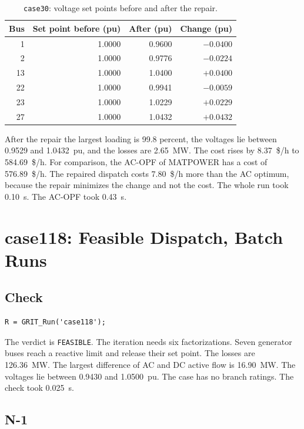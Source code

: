 \documentclass[a4paper,11pt]{article}
\begin{document}
\begin{table}[H]\centering
\begin{tabular}{@{}rrrr@{}}
\toprule
\textbf{Bus} & \textbf{Set point before (pu)} & \textbf{After (pu)} & \textbf{Change (pu)} \\
\midrule
1 & 1.0000 & 0.9600 & $-0.0400$ \\
2 & 1.0000 & 0.9776 & $-0.0224$ \\
13 & 1.0000 & 1.0400 & $+0.0400$ \\
22 & 1.0000 & 0.9941 & $-0.0059$ \\
23 & 1.0000 & 1.0229 & $+0.0229$ \\
27 & 1.0000 & 1.0432 & $+0.0432$ \\
\bottomrule
\end{tabular}
\caption{\texttt{case30}: voltage set points before and after the repair.}
\end{table}

After the repair the largest loading is 99.8 percent, the voltages lie between 0.9529 and 1.0432~pu, and the losses are 2.65~MW. The cost rises by 8.37~\$/h to 584.69~\$/h. For comparison, the AC-OPF of MATPOWER has a cost of 576.89~\$/h. The repaired dispatch costs 7.80~\$/h more than the AC optimum, because the repair minimizes the change and not the cost. The whole run took 0.10~s. The AC-OPF took 0.43~s.

\section{case118: Feasible Dispatch, Batch Runs}\label{sec:ex118}

\subsection{Check}

\begin{lstlisting}
R = GRIT_Run('case118');
\end{lstlisting}

The verdict is \texttt{FEASIBLE}. The iteration needs six factorizations. Seven generator buses reach a reactive limit and release their set point. The losses are 126.36~MW. The largest difference of AC and DC active flow is 16.90~MW. The voltages lie between 0.9430 and 1.0500~pu. The case has no branch ratings. The check took 0.025~s.

\subsection{N-1}
\end{document}
